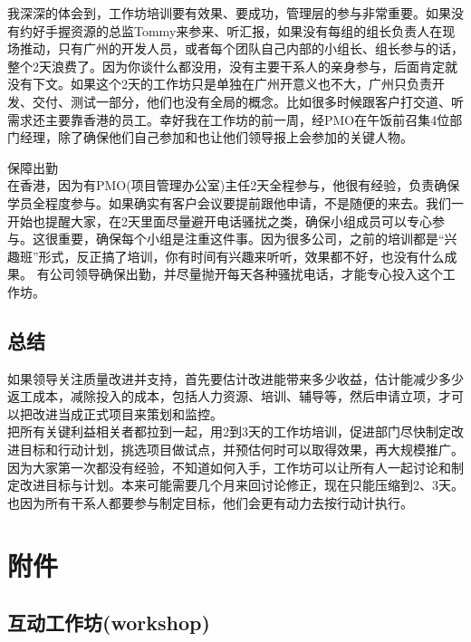 我深深的体会到，工作坊培训要有效果、要成功，管理层的参与非常重要。如果没有约好手握资源的总监Tommy来参来、听汇报，如果没有每组的组长负责人在现场推动，只有广州的开发人员，或者每个团队自己内部的小组长、组长参与的话，整个2天浪费了。因为你谈什么都没用，没有主要干系人的亲身参与，后面肯定就没有下文。如果这个2天的工作坊只是单独在广州开意义也不大，广州只负责开发、交付、测试一部分，他们也没有全局的概念。比如很多时候跟客户打交道、听需求还主要靠香港的员工。幸好我在工作坊的前一周，经PMO在午饭前召集4位部门经理，除了确保他们自己参加和也让他们领导报上会参加的关键人物。

保障出勤\\
在香港，因为有PMO(项目管理办公室)主任2天全程参与，他很有经验，负责确保学员全程度参与。如果确实有客户会议要提前跟他申请，不是随便的来去。我们一开始也提醒大家，在2天里面尽量避开电话骚扰之类，确保小组成员可以专心参与。这很重要，确保每个小组是注重这件事。因为很多公司，之前的培训都是``兴趣班''形式，反正搞了培训，你有时间有兴趣来听听，效果都不好，也没有什么成果。
有公司领导确保出勤，并尽量抛开每天各种骚扰电话，才能专心投入这个工作坊。

\hypertarget{ux603bux7ed3}{%
\subsection{总结}\label{ux603bux7ed3}}

如果领导关注质量改进并支持，首先要估计改进能带来多少收益，估计能减少多少返工成本，减除投入的成本，包括人力资源、培训、辅导等，然后申请立项，才可以把改进当成正式项目来策划和监控。\\
把所有关键利益相关者都拉到一起，用2到3天的工作坊培训，促进部门尽快制定改进目标和行动计划，挑选项目做试点，并预估何时可以取得效果，再大规模推广。\\
因为大家第一次都没有经验，不知道如何入手，工作坊可以让所有人一起讨论和制定改进目标与计划。本来可能需要几个月来回讨论修正，现在只能压缩到2、3天。\\
也因为所有干系人都要参与制定目标，他们会更有动力去按行动计执行。

\hypertarget{ux9644ux4ef6}{%
\section{附件}\label{ux9644ux4ef6}}

\hypertarget{ux4e92ux52a8ux5de5ux4f5cux574aworkshop}{%
\subsection{互动工作坊(workshop)}\label{ux4e92ux52a8ux5de5ux4f5cux574aworkshop}}

